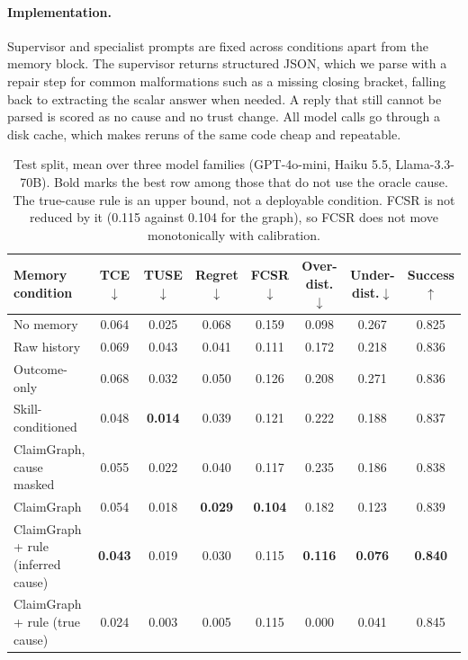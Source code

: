 \documentclass[letterpaper]{article}
\begin{document}
\paragraph{Implementation.}
Supervisor and specialist prompts are fixed across conditions apart from the memory block. The supervisor returns structured JSON, which we parse with a repair step for common malformations such as a missing closing bracket, falling back to extracting the scalar answer when needed. A reply that still cannot be parsed is scored as no cause and no trust change. All model calls go through a disk cache, which makes reruns of the same code cheap and repeatable.

\begin{table}[t]
\centering\small
\begin{tabular}{lccccccc}
\toprule
Memory condition & TCE$\downarrow$ & TUSE$\downarrow$ & Regret$\downarrow$ & FCSR$\downarrow$ & Over-dist.$\downarrow$ & Under-dist.$\downarrow$ & Success$\uparrow$\\
\midrule
No memory & 0.064 & 0.025 & 0.068 & 0.159 & 0.098 & 0.267 & 0.825 \\
Raw history & 0.069 & 0.043 & 0.041 & 0.111 & 0.172 & 0.218 & 0.836 \\
Outcome-only & 0.068 & 0.032 & 0.050 & 0.126 & 0.208 & 0.271 & 0.836 \\
Skill-conditioned & 0.048 & \textbf{0.014} & 0.039 & 0.121 & 0.222 & 0.188 & 0.837 \\
ClaimGraph, cause masked & 0.055 & 0.022 & 0.040 & 0.117 & 0.235 & 0.186 & 0.838 \\
ClaimGraph & 0.054 & 0.018 & \textbf{0.029} & \textbf{0.104} & 0.182 & 0.123 & 0.839 \\
ClaimGraph + rule (inferred cause) & \textbf{0.043} & 0.019 & 0.030 & 0.115 & \textbf{0.116} & \textbf{0.076} & \textbf{0.840} \\
\midrule
ClaimGraph + rule (true cause) & 0.024 & 0.003 & 0.005 & 0.115 & 0.000 & 0.041 & 0.845 \\
\bottomrule
\end{tabular}
\caption{Test split, mean over three model families (GPT-4o-mini, Haiku 5.5, Llama-3.3-70B). Bold marks the best row among those that do not use the oracle cause. The true-cause rule is an upper bound, not a deployable condition. FCSR is not reduced by it (0.115 against 0.104 for the graph), so FCSR does not move monotonically with calibration.}
\label{tab:main}
\end{table}
\end{document}
